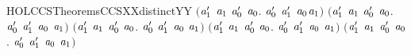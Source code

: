\begin{SaveVerbatim}{HOLCCSTheoremsCCSXXdistinctYY}
   \ensuremath{(}\HOLSymConst{\HOLTokenForall{}}\ensuremath{\HOLBoundVar{a}\sb{\mathrm{1}}\sp{\prime}} \ensuremath{\HOLBoundVar{a}\sb{\mathrm{1}}} \ensuremath{\HOLBoundVar{a}\sb{\mathrm{0}}\sp{\prime}} \ensuremath{\HOLBoundVar{a}\sb{\mathrm{0}}}.  \ensuremath{\HOLBoundVar{a}\sb{\mathrm{0}}\sp{\prime}} \ensuremath{\HOLBoundVar{a}\sb{\mathrm{1}}\sp{\prime}} \HOLSymConst{\HOLTokenNotEqual{}} \ensuremath{\HOLBoundVar{a}\sb{\mathrm{0}}}\HOLSymConst{\ensuremath{\ldotp}}\ensuremath{\HOLBoundVar{a}\sb{\mathrm{1}}}\ensuremath{)} \HOLSymConst{\HOLTokenConj{}}
   \ensuremath{(}\HOLSymConst{\HOLTokenForall{}}\ensuremath{\HOLBoundVar{a}\sb{\mathrm{1}}\sp{\prime}} \ensuremath{\HOLBoundVar{a}\sb{\mathrm{1}}} \ensuremath{\HOLBoundVar{a}\sb{\mathrm{0}}\sp{\prime}} \ensuremath{\HOLBoundVar{a}\sb{\mathrm{0}}}. \ensuremath{\HOLBoundVar{a}\sb{\mathrm{0}}\sp{\prime}} \HOLSymConst{\ensuremath{\mid}} \ensuremath{\HOLBoundVar{a}\sb{\mathrm{1}}\sp{\prime}} \HOLSymConst{\HOLTokenNotEqual{}} \ensuremath{\HOLBoundVar{a}\sb{\mathrm{0}}} \HOLSymConst{\ensuremath{+}} \ensuremath{\HOLBoundVar{a}\sb{\mathrm{1}}}\ensuremath{)} \HOLSymConst{\HOLTokenConj{}}
   \ensuremath{(}\HOLSymConst{\HOLTokenForall{}}\ensuremath{\HOLBoundVar{a}\sb{\mathrm{1}}\sp{\prime}} \ensuremath{\HOLBoundVar{a}\sb{\mathrm{1}}} \ensuremath{\HOLBoundVar{a}\sb{\mathrm{0}}\sp{\prime}} \ensuremath{\HOLBoundVar{a}\sb{\mathrm{0}}}.  \ensuremath{\HOLBoundVar{a}\sb{\mathrm{0}}\sp{\prime}} \ensuremath{\HOLBoundVar{a}\sb{\mathrm{1}}\sp{\prime}} \HOLSymConst{\HOLTokenNotEqual{}} \ensuremath{\HOLBoundVar{a}\sb{\mathrm{0}}} \HOLSymConst{\ensuremath{+}} \ensuremath{\HOLBoundVar{a}\sb{\mathrm{1}}}\ensuremath{)} \HOLSymConst{\HOLTokenConj{}}
   \ensuremath{(}\HOLSymConst{\HOLTokenForall{}}\ensuremath{\HOLBoundVar{a}\sb{\mathrm{1}}\sp{\prime}} \ensuremath{\HOLBoundVar{a}\sb{\mathrm{1}}} \ensuremath{\HOLBoundVar{a}\sb{\mathrm{0}}\sp{\prime}} \ensuremath{\HOLBoundVar{a}\sb{\mathrm{0}}}.  \ensuremath{\HOLBoundVar{a}\sb{\mathrm{0}}\sp{\prime}} \ensuremath{\HOLBoundVar{a}\sb{\mathrm{1}}\sp{\prime}} \HOLSymConst{\HOLTokenNotEqual{}} \ensuremath{\HOLBoundVar{a}\sb{\mathrm{0}}} \HOLSymConst{\ensuremath{+}} \ensuremath{\HOLBoundVar{a}\sb{\mathrm{1}}}\ensuremath{)} \HOLSymConst{\HOLTokenConj{}}
   \ensuremath{(}\HOLSymConst{\HOLTokenForall{}}\ensuremath{\HOLBoundVar{a}\sb{\mathrm{1}}\sp{\prime}} \ensuremath{\HOLBoundVar{a}\sb{\mathrm{1}}} \ensuremath{\HOLBoundVar{a}\sb{\mathrm{0}}\sp{\prime}} \ensuremath{\HOLBoundVar{a}\sb{\mathrm{0}}}.  \ensuremath{\HOLBoundVar{a}\sb{\mathrm{0}}\sp{\prime}} \ensuremath{\HOLBoundVar{a}\sb{\mathrm{1}}\sp{\prime}} \HOLSymConst{\HOLTokenNotEqual{}} \ensuremath{\HOLBoundVar{a}\sb{\mathrm{0}}} \HOLSymConst{\ensuremath{+}} \ensuremath{\HOLBoundVar{a}\sb{\mathrm{1}}}\ensuremath{)} \HOLSymConst{\HOLTokenConj{}}

\end{SaveVerbatim}
